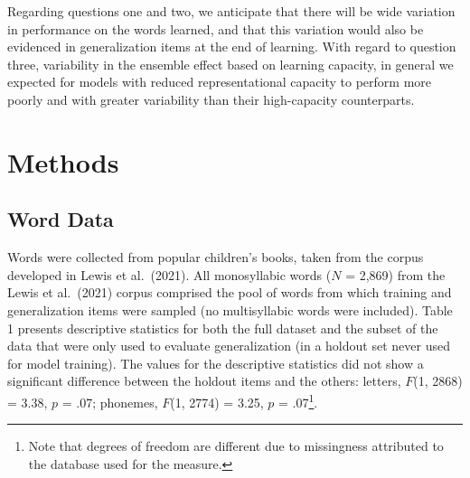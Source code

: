 \documentclass[
  ,man,floatsintext]{apa6}
\begin{document}
Regarding questions one and two, we anticipate that there will be wide variation in performance on the words learned, and that this variation would also be evidenced in generalization items at the end of learning. With regard to question three, variability in the ensemble effect based on learning capacity, in general we expected for models with reduced representational capacity to perform more poorly and with greater variability than their high-capacity counterparts.

\section{Methods}\label{methods}

\subsection{Word Data}\label{word-data}

Words were collected from popular children's books, taken from the corpus developed in Lewis et al.~(2021). All monosyllabic words (\(N\) = 2,869) from the Lewis et al.~(2021) corpus comprised the pool of words from which training and generalization items were sampled (no multisyllabic words were included). Table 1 presents descriptive statistics for both the full dataset and the subset of the data that were only used to evaluate generalization (in a holdout set never used for model training). The values for the descriptive statistics did not show a significant difference between the holdout items and the others: letters, \(F\)(1, 2868) = 3.38, \(p\) = .07; phonemes, \(F\)(1, 2774) = 3.25, \(p\) = .07\footnote{Note that degrees of freedom are different due to missingness attributed to the database used for the measure.}.
\end{document}
